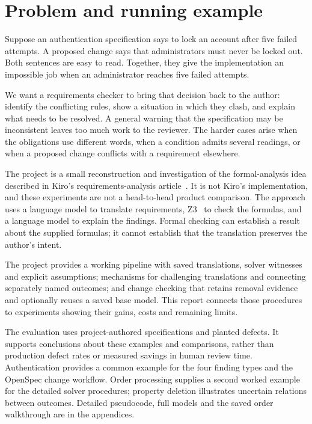 \section{Problem and running example}\label{sec:intro}\label{sec:problem}

Suppose an authentication specification says to lock an account after five failed attempts. A proposed change says that administrators must never be locked out. Both sentences are easy to read. Together, they give the implementation an impossible job when an administrator reaches five failed attempts.

We want a requirements checker to bring that decision back to the author: identify the conflicting rules, show a situation in which they clash, and explain what needs to be resolved. A general warning that the specification may be inconsistent leaves too much work to the reviewer. The harder cases arise when the obligations use different words, when a condition admits several readings, or when a proposed change conflicts with a requirement elsewhere.

The project is a small reconstruction and investigation of the formal-analysis idea described in Kiro's requirements-analysis article~\citep{kiro2026}. It is not Kiro's implementation, and these experiments are not a head-to-head product comparison. The approach uses a language model to translate requirements, Z3~\citep{z3} to check the formulas, and a language model to explain the findings. Formal checking can establish a result about the supplied formulas; it cannot establish that the translation preserves the author's intent.

The project provides a working pipeline with saved translations, solver witnesses and explicit assumptions; mechanisms for challenging translations and connecting separately named outcomes; and change checking that retains removal evidence and optionally reuses a saved base model. This report connects those procedures to experiments showing their gains, costs and remaining limits.

The evaluation uses project-authored specifications and planted defects. It supports conclusions about these examples and comparisons, rather than production defect rates or measured savings in human review time. Authentication provides a common example for the four finding types and the OpenSpec change workflow. Order processing supplies a second worked example for the detailed solver procedures; property deletion illustrates uncertain relations between outcomes. Detailed pseudocode, full models and the saved order walkthrough are in the appendices.
